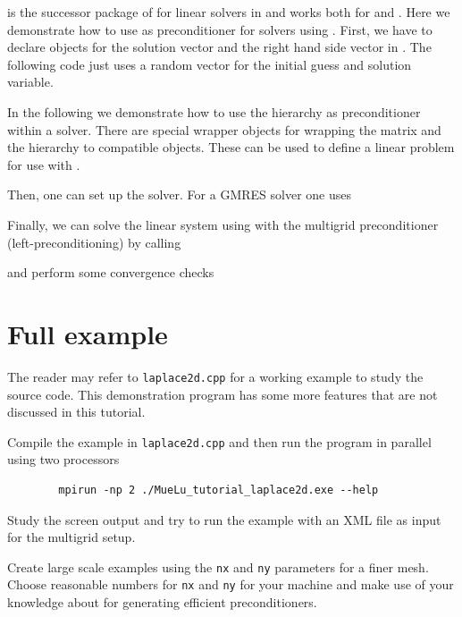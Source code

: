 \documentclass[10pt,fleqn]{book}
\providecommand\printCppListing[1]{

}
\begin{document}
\belos is the successor package of \aztecoo for linear solvers in \trilinos and works both for \epetra and \tpetra. Here we demonstrate how to use \muelu as preconditioner for \belos solvers using \xpetra.
First, we have to declare objects for the solution vector and the right hand side vector in \xpetra. The following code just uses a random vector for the initial guess and solution variable.
\printCppListing{ScalingTest.cpp_24.fragment}

In the following we demonstrate how to use the \muelu hierarchy as preconditioner within a \belos solver. There are special wrapper objects for wrapping the \xpetra matrix and the \muelu hierarchy to \belos compatible objects. These can be used to define a linear problem for use with \belos.
\printCppListing{ScalingTest.cpp_26.fragment}

Then, one can set up the \belos solver. For a \belos GMRES solver one uses
\printCppListing{ScalingTest.cpp_28.fragment}
Finally, we can solve the linear system using \belos with the \muelu multigrid preconditioner (left-preconditioning) by calling
\printCppListing{ScalingTest.cpp_30.fragment}
and perform some convergence checks
\printCppListing{ScalingTest.cpp_32.fragment}

\section{Full example}

The reader may refer to \texttt{laplace2d.cpp} for a working example to study the source code. This demonstration program has some more features that are not discussed in this tutorial.

\begin{exercise}
Compile the example in \texttt{laplace2d.cpp} and then run the program in parallel using two processors
        \begin{verbatim}
        mpirun -np 2 ./MueLu_tutorial_laplace2d.exe --help
        \end{verbatim}
        Study the screen output and try to run the example with an XML file as input for the multigrid setup.
\end{exercise}
\begin{exercise}
Create large scale examples using the \verb|nx| and \verb|ny| parameters for a finer mesh. Choose reasonable numbers for \verb|nx| and \verb|ny| for your machine and make use of your knowledge about \muelu for generating efficient preconditioners.
\end{exercise}
\end{document}
